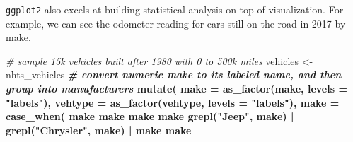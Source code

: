 \documentclass[
]{book}
\newenvironment{Shaded}{\begin{snugshade}}{\end{snugshade}}
\newcommand{\CommentTok}[1]{\textcolor[rgb]{0.56,0.35,0.01}{\textit{#1}}}
\newcommand{\DataTypeTok}[1]{\textcolor[rgb]{0.13,0.29,0.53}{#1}}
\newcommand{\KeywordTok}[1]{\textcolor[rgb]{0.13,0.29,0.53}{\textbf{#1}}}
\newcommand{\NormalTok}[1]{#1}
\newcommand{\OperatorTok}[1]{\textcolor[rgb]{0.81,0.36,0.00}{\textbf{#1}}}
\newcommand{\StringTok}[1]{\textcolor[rgb]{0.31,0.60,0.02}{#1}}
\begin{document}
\texttt{ggplot2} also excels at building statistical analysis on top of visualization.
For example, we can see the odometer reading for cars still on the road in
2017 by make.

\begin{Shaded}
\begin{Highlighting}[]
\CommentTok{# sample 15k vehicles built after 1980 with 0 to 500k miles}
\NormalTok{vehicles <-}\StringTok{ }\NormalTok{nhts_vehicles }\OperatorTok{%
\StringTok{  }\CommentTok{# convert numeric make to its labeled name, and then group into manufacturers}
\StringTok{  }\KeywordTok{mutate}\NormalTok{(}
    \DataTypeTok{make =} \KeywordTok{as_factor}\NormalTok{(make, }\DataTypeTok{levels =} \StringTok{"labels"}\NormalTok{),}
    \DataTypeTok{vehtype =} \KeywordTok{as_factor}\NormalTok{(vehtype, }\DataTypeTok{levels =} \StringTok{"labels"}\NormalTok{),}
    \DataTypeTok{make =} \KeywordTok{case_when}\NormalTok{(}
\NormalTok{      make }\OperatorTok{%
\NormalTok{      make }\OperatorTok{%
\NormalTok{      make }\OperatorTok{%
\NormalTok{      make }\OperatorTok{%
      \KeywordTok{grepl}\NormalTok{(}\StringTok{"Jeep"}\NormalTok{, make) }\OperatorTok{|}\StringTok{ }\KeywordTok{grepl}\NormalTok{(}\StringTok{"Chrysler"}\NormalTok{, make) }\OperatorTok{|}\StringTok{ }\NormalTok{make }\OperatorTok{%
\NormalTok{      make }\OperatorTok{%
}}}}}}}
\end{Highlighting}
\end{Shaded}
\end{document}
